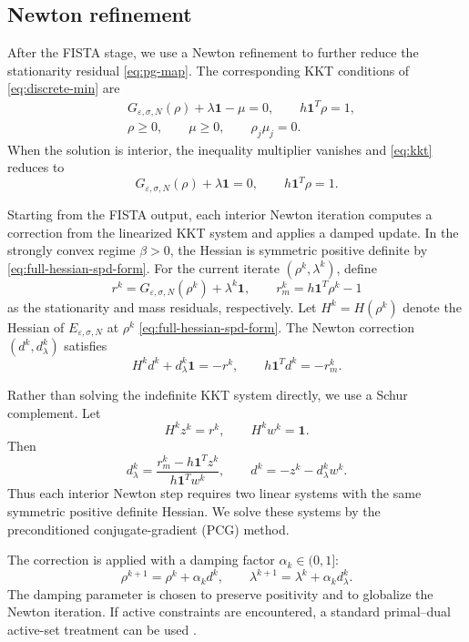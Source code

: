 \documentclass[11pt]{article}
\newcommand{\eps}{\varepsilon}
\newcommand{\sig}{\sigma}
\theoremstyle{plain}
\theoremstyle{definition}
\numberwithin{equation}{section}
\begin{document}
\subsection{Newton refinement}
\label{subsec:Newton-PCG}

After the FISTA stage, we use a Newton refinement to further reduce
the stationarity residual \eqref{eq:pg-map}. The corresponding KKT conditions of
\eqref{eq:discrete-min} are 
\begin{equation}
\label{eq:kkt}
\begin{aligned}
& G_{\eps,\sig,N}(\rho)+\lambda\bm1-\mu=0,
\qquad
h\bm1^T\rho=1,\\
& \rho\ge0,\qquad
\mu\ge0,\qquad
\rho_j\mu_j=0.
\end{aligned}
\end{equation}
When the solution is interior, the inequality multiplier vanishes and
\eqref{eq:kkt} reduces to
\begin{equation}
\label{eq:interior-kkt}
G_{\eps,\sig,N}(\rho)+\lambda\bm1=0,
\qquad
h\bm1^T\rho=1.
\end{equation}

Starting from the FISTA output, each interior Newton iteration
computes a correction from the linearized KKT system and applies a
damped update. In the strongly convex regime $\beta>0$, the Hessian
is symmetric positive definite by
\eqref{eq:full-hessian-spd-form}. For the current iterate
$(\rho^k,\lambda^k)$, define
\[
r^k
=
G_{\eps,\sig,N}(\rho^k)+\lambda^k\bm1,
\qquad
r_m^k
=
h\bm1^T\rho^k-1
\]
as the stationarity and mass residuals, respectively.
Let $H^k=H(\rho^k)$ denote the Hessian of
$E_{\eps,\sig,N}$ at $\rho^k$ \eqref{eq:full-hessian-spd-form}.
The Newton correction
$(d^k,d_\lambda^k)$ satisfies
\[
H^kd^k+d_\lambda^k\bm1=-r^k,
\qquad
h\bm1^Td^k=-r_m^k.
\]

Rather than solving the indefinite KKT system directly, we use a
Schur complement. Let
\[
H^kz^k=r^k,
\qquad
H^kw^k=\bm1.
\]
Then
\begin{equation}
\label{eq:schur-two-solves}
d_\lambda^k
=
\frac{r_m^k-h\bm1^Tz^k}
     {h\bm1^Tw^k},
\qquad
d^k
=
-z^k-d_\lambda^kw^k.
\end{equation}
Thus each interior Newton step requires two linear systems with the
same symmetric positive definite Hessian. We solve these systems by
the preconditioned conjugate-gradient (PCG) method.

The correction is applied with a damping factor
$\alpha_k\in(0,1]$:
\[
\rho^{k+1}
=
\rho^k+\alpha_kd^k,
\qquad
\lambda^{k+1}
=
\lambda^k+\alpha_kd_\lambda^k.
\]
The damping parameter is chosen to preserve positivity and to
globalize the Newton iteration. If active constraints are
encountered, a standard primal--dual active-set treatment can be used 
\cite{Ulbrich2011}.
\end{document}
